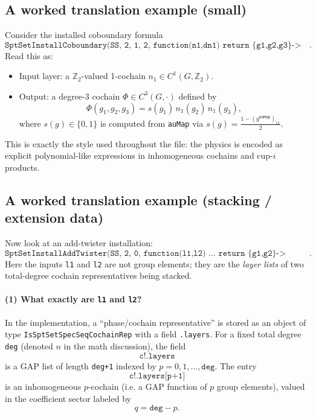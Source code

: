 \documentclass{SciPost}
\begin{document}
\subsection{A worked translation example (small)}

Consider the installed coboundary formula
\begin{equation}
	\texttt{SptSetInstallCoboundary(SS, 2, 1, 2, function(n1,dn1) return \{g1,g2,g3\}-> s(g1)*n1(g2)*n1(g3); end)}.
\end{equation}
Read this as:
\begin{itemize}
    \item Input layer: a $\mathbb{Z}_2$-valued 1-cochain $n_1\in C^{1}(G,\mathbb{Z}_2)$.
    \item Output: a degree-3 cochain $\Phi\in C^{3}(G,\cdot)$ defined by
    \begin{equation}
    \Phi(g_1,g_2,g_3)= s(g_1)\,n_1(g_2)\,n_1(g_3),
    \end{equation}
    where $s(g)\in\{0,1\}$ is computed from \texttt{auMap} via $s(g)=\frac{1-(g^{\texttt{auMap}})_{11}}{2}$.
\end{itemize}
This is exactly the style used throughout the file: the physics is encoded as explicit polynomial-like expressions in inhomogeneous cochains and cup-$i$ products.

\subsection{A worked translation example (stacking / extension data)}

Now look at an add-twister installation:
\begin{equation}
	\texttt{SptSetInstallAddTwister(SS, 2, 0, function(l1,l2) ... return \{g1,g2\} -> 1/2*n11(g1)*n12(g2); end)}.
\end{equation}
Here the inputs \texttt{l1} and \texttt{l2} are not group elements; they are the \emph{layer lists} of two total-degree cochain representatives being stacked.

\paragraph{(1) What exactly are \texttt{l1} and \texttt{l2}?}
In the implementation, a ``phase/cochain representative'' is stored as an object of type \texttt{IsSptSetSpecSeqCochainRep} with a field \texttt{.layers}.
For a fixed total degree \texttt{deg} (denoted $n$ in the math discussion), the field
\begin{equation}
	\texttt{c!.layers}
\end{equation}
is a GAP list of length \texttt{deg+1} indexed by $p=0,1,\dots,\texttt{deg}$.
The entry
\begin{equation}
	\texttt{c!.layers[p+1]}
\end{equation}
is an inhomogeneous $p$-cochain (i.e. a GAP function of $p$ group elements), valued in the coefficient sector labeled by
\begin{equation}
q = \texttt{deg} - p.
\end{equation}
\end{document}
